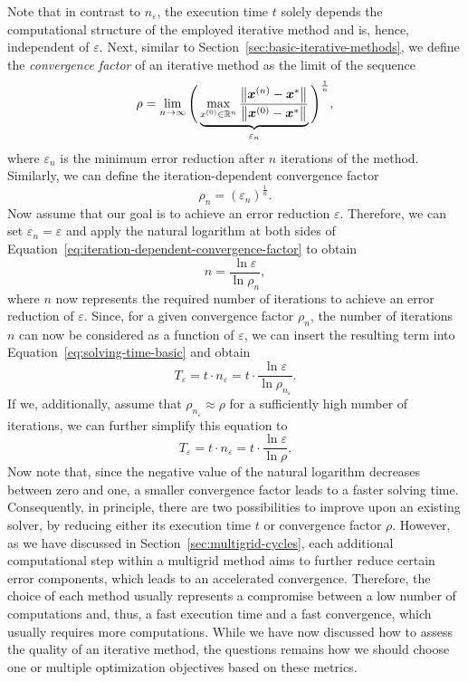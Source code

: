 Note that in contrast to $n_{\varepsilon}$, the execution time $t$ solely depends the computational structure of the employed iterative method and is, hence, independent of $\varepsilon$.
Next, similar to Section~\ref{sec:basic-iterative-methods}, we define the \emph{convergence factor} of an iterative method as the limit of the sequence
\begin{equation*}
	\rho = \lim \limits_{n \to  \infty} \Bigg( \underbrace{ \max \limits_{x^{(0)} \in \mathbb{R}^{n}} \frac{\norm{\bm{x}^{(n)} - \bm{x}^{*}}}{\norm{\bm{x}^{(0)} - \bm{x}^{*}}} }_{\varepsilon_n} \Bigg)^{\frac{1}{n}},
\end{equation*}
where $\varepsilon_n$  is the minimum error reduction after $n$ iterations of the method.
Similarly, we can define the iteration-dependent convergence factor
\begin{equation}
	\rho_n = \left( \varepsilon_n \right)^{\frac{1}{n}}.
	\label{eq:iteration-dependent-convergence-factor}
\end{equation} 
Now assume that our goal is to achieve an error reduction $\varepsilon$.
Therefore, we can set $\varepsilon_n = \varepsilon$ and apply the natural logarithm at both sides of Equation~\eqref{eq:iteration-dependent-convergence-factor} to obtain
\begin{equation*}
	n = \frac{\ln \varepsilon}{\ln \rho_n},
\end{equation*} 
where $n$ now represents the required number of iterations to achieve an error reduction of $\varepsilon$.
Since, for a given convergence factor $\rho_n$, the number of iterations $n$ can now be considered as a function of $\varepsilon$, we can insert the resulting term into Equation~\eqref{eq:solving-time-basic} and obtain
\begin{equation*}
	T_{\varepsilon} = t \cdot n_{\varepsilon} = t \cdot \frac{\ln \varepsilon}{\ln \rho_{n_{\varepsilon}}}.
\end{equation*} 
If we, additionally, assume that $\rho_{n_{\varepsilon}} \approx \rho$ for a sufficiently high number of iterations, we can further simplify this equation to
\begin{equation*}
	T_{\varepsilon} = t \cdot n_{\varepsilon} = t \cdot \frac{\ln \varepsilon}{\ln \rho}.
\end{equation*} 
Now note that, since the negative value of the natural logarithm decreases between zero and one, a smaller convergence factor leads to a faster solving time.
Consequently, in principle, there are two possibilities to improve upon an existing solver, by reducing either its execution time $t$ or convergence factor $\rho$. 
However, as we have discussed in Section~\ref{sec:multigrid-cycles}, each additional computational step within a multigrid method aims to further reduce certain error components, which leads to an accelerated convergence.
Therefore, the choice of each method usually represents a compromise between a low number of computations and, thus, a fast execution time and a fast convergence, which usually requires more computations.
While we have now discussed how to assess the quality of an iterative method, the questions remains how we should choose one or multiple optimization objectives based on these metrics.   
 

